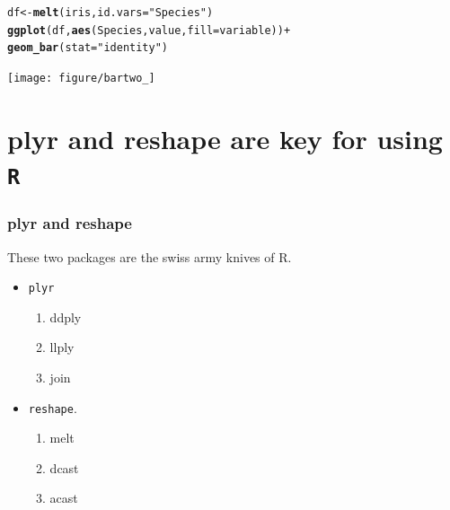 \documentclass{beamer}\usepackage[]{graphicx}\usepackage[]{color}
\makeatletter
\newcommand{\hlstr}[1]{\textcolor[rgb]{0.192,0.494,0.8}{#1}}%
\newcommand{\hlkwd}[1]{\textcolor[rgb]{0.737,0.353,0.396}{\textbf{#1}}}%
\newenvironment{kframe}{%
 \def\at@end@of@kframe{}%
 \ifinner\ifhmode%
  \def\at@end@of@kframe{\end{minipage}}%
  \begin{minipage}{\columnwidth}%
 \fi\fi%
 \def\FrameCommand##1{\hskip\@totalleftmargin \hskip-\fboxsep
 \colorbox{shadecolor}{##1}\hskip-\fboxsep
     \hskip-\linewidth \hskip-\@totalleftmargin \hskip\columnwidth}%
 \MakeFramed {\advance\hsize-\width
   \@totalleftmargin\z@ \linewidth\hsize
   \@setminipage}}%
 {\par\unskip\endMakeFramed%
 \at@end@of@kframe}
\newenvironment{knitrout}{}{} %
\makeatother
\begin{document}
\begin{frame}[fragile]
\begin{knitrout}\footnotesize
{}\color{fgcolor}\begin{kframe}
\begin{alltt}
df  <- \hlkwd{melt}(iris, id.vars = \hlstr{"Species"})
\hlkwd{ggplot}(df, \hlkwd{aes}(Species, value, fill = variable)) +
\hlkwd{geom_bar}(stat = \hlstr{"identity"})
\end{alltt}
\end{kframe}

{\centering \texttt{[image: figure/bartwo\_]} 

}



\end{knitrout}

\end{frame}


\section*{plyr and reshape are key for using \texttt{R}}
\frame{\sectionpage}


\begin{frame}[fragile]
\frametitle{plyr and reshape}
These two packages are the swiss army knives of R.
\begin{itemize}
\item \texttt{plyr}
    \begin{enumerate}
    \item ddply
    \item llply
    \item join
    \end{enumerate}
\item \texttt{reshape}.
    \begin{enumerate}
    \item melt
    \item dcast
    \item acast
    \end{enumerate}
\end{itemize}
\end{frame}
\end{document}

